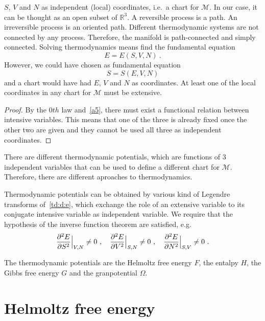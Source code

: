     $S$, $V$ and $N$ as independent (local) coordinates, i.e.~a chart for $\mathcal M$. In our case, it can be thought as an open subset of $\mathbb R^3$. A reversible process is a path. An irreversible process is an oriented path. Different thermodynamic systems are not connected by any process. Therefore, the manifold is path-connected and simply connected. Solving thermodynamics means find the fundamental equation 
    \begin{equation*}
        E = E(S, V, N) ~.
    \end{equation*}
    However, we could have chosen as fundamental equation 
    \begin{equation*}
        S = S(E, V, N) 
    \end{equation*}
    and a chart would have had $E$, $V$ and $N$ as coordinates. At least one of the local coordinates in any chart for $\mathcal M$ must be extensive. 
    \begin{proof}
        By the $0th$ law and~\eqref{a5}, there must exist a functional relation between intensive variables. This means that one of the three is already fixed once the other two are given and they cannot be used all three as independent coordinates.
    \end{proof}

    There are different thermodynamic potentials, which are functions of $3$ independent variables that can be used to define a different chart for $\mathcal M$. Therefore, there are different aproaches to thermodynamics.

    Thermodynamic potentials can be obtained by various kind of Legendre transforms of~\eqref{td:d:e}, which exchange the role of an extensive variable to its conjugate intensive variable as independent variable. We require that the hypothesis of the inverse function theorem are satisfied, e.g. 
    \begin{equation*}
        \frac{\partial^2 E}{\partial S^2} \Big \vert_{V,N} \neq 0 ~, \quad \frac{\partial^2 E}{\partial V^2} \Big \vert_{S,N} \neq 0 ~, \quad \frac{\partial^2 E}{\partial N^2} \Big \vert_{S, V} \neq 0 ~.
    \end{equation*}

    The thermodynamic potentials are the Helmoltz free energy $F$, the entalpy $H$, the Gibbs free energy $G$ and the granpotential $\Omega$.

\section{Helmoltz free energy} 

